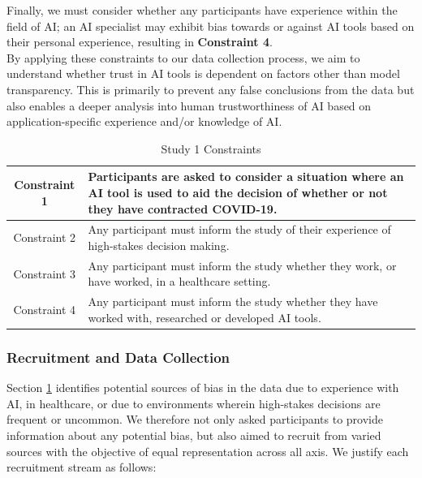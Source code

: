 \documentclass[manuscript,screen,review]{acmart}
\begin{document}
Finally, we must consider whether any participants have experience within the field of AI; an AI specialist may exhibit bias towards or against AI tools based on their personal experience, resulting in \textbf{Constraint 4}. \\

By applying these constraints to our data collection process, we aim to understand whether trust in AI tools is dependent on factors other than model transparency. This is primarily to prevent any false conclusions from the data but also enables a deeper analysis into human trustworthiness of AI based on application-specific experience and/or knowledge of AI.

\begin{table}
\begin{center}
\begin{tabular}{ | c | p{11cm} |}
\hline
 Constraint 1 & Participants are asked to consider a situation where an AI tool is used to aid the decision of whether or not they have contracted COVID-19. \\  
 \hline
 Constraint 2 & Any participant must inform the study of their experience of high-stakes decision making. \\
 \hline
Constraint 3 & Any participant must inform the study whether they work, or have worked, in a healthcare setting. \\
 \hline
 Constraint 4 & Any participant must inform the study whether they have worked with, researched or developed AI tools. \\
\hline
\end{tabular}
\caption{Study 1 Constraints}
\label{table:study1_constraints}
\end{center}
\end{table}

\subsubsection{Recruitment and Data Collection}
\label{study1_recruitment_datacollection}

Section \ref{table:study1_constraints} identifies potential sources of bias in the data due to experience with AI, in healthcare, or due to environments wherein high-stakes decisions are frequent or uncommon. We therefore not only asked participants to provide information about any potential bias, but also aimed to recruit from varied sources with the objective of equal representation across all axis. We justify each recruitment stream as follows:
\end{document}
